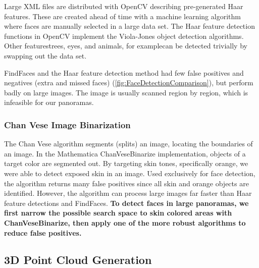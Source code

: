 Large XML files are distributed with OpenCV describing pre-generated Haar features. These are created ahead of time with a machine learning algorithm where faces are manually selected in a large data set. The Haar feature detection functions in OpenCV implement the Viola-Jones object detection algorithms. Other features\textemdash trees, eyes, and animals, for example\textemdash can be detected trivially by swapping out the data set.

FindFaces and the Haar feature detection method had few false positives and negatives (extra and missed faces) (\autoref{fig:FaceDetectionComparison}), but perform badly on large images. The image is usually scanned region by region, which is infeasible for our panoramas.

\subsubsection{Chan Vese Image Binarization}

The Chan Vese algorithm segments (splits) an image, locating the boundaries of an image. In the Mathematica ChanVeseBinarize implementation\cite{Wolfram:ChanVese}, objects of a target color are segmented out. By targeting skin tones, specifically orange, we were able to detect exposed skin in an image. Used exclusively for face detection, the algorithm returns many false positives since all skin and orange objects are identified. However, the algorithm can process large images far faster than Haar feature detections and FindFaces. \textbf{To detect faces in large panoramas, we first narrow the possible search space to skin colored areas with ChanVeseBinarize, then apply one of the more robust algorithms to reduce false positives.}

\subsection{3D Point Cloud Generation}

